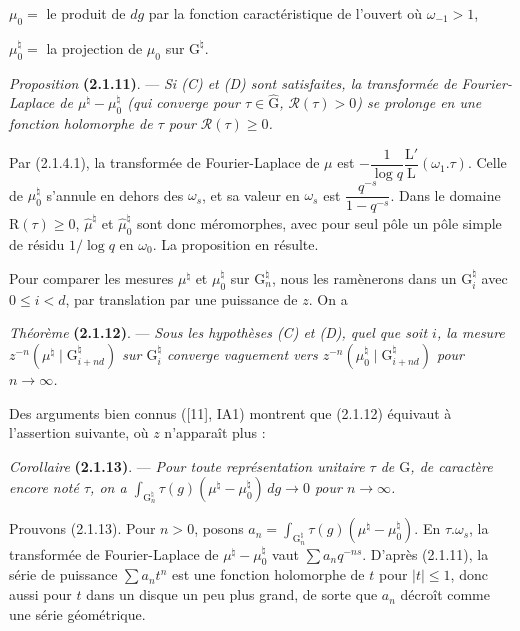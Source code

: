 \documentclass[11pt,leqno]{article}
\begin{document}
\noindent \(\mu_0=\) le produit de \(dg\) par la fonction caractéristique de l’ouvert où \(\omega_{-1}>1\),

\noindent \(\mu_0^{\natural}=\) la projection de \(\mu_0\) sur \(\mathrm{G}^{\natural}\).

\textit{Proposition} \textbf{(2.1.11)}. — \textit{Si \textup{(C)} et \textup{(D)} sont satisfaites, la transformée de Fourier-Laplace de \(\mu^{\natural}-\mu_0^{\natural}\) (qui converge pour \(\tau\in\widehat{\mathrm{G}}\), \(\mathscr{R}(\tau)>0\)) se prolonge en une fonction holomorphe de \(\tau\) pour \(\mathscr{R}(\tau)\geq0\).}

Par (2.1.4.1), la transformée de Fourier-Laplace de \(\mu\) est \(-\dfrac{1}{\log q}\dfrac{\mathrm{L}'}{\mathrm{L}}(\omega_1.\tau)\). Celle de \(\mu_0^{\natural}\) s’annule en dehors des \(\omega_s\), et sa valeur en \(\omega_s\) est \(\dfrac{q^{-s}}{1-q^{-s}}\). Dans le domaine \(\mathrm{R}(\tau)\geq0\), \(\widehat{\mu}^{\natural}\) et \(\widehat{\mu}_0^{\natural}\) sont donc méromorphes, avec pour seul pôle un pôle simple de résidu \(1/\log q\) en \(\omega_0\). La proposition en résulte.

Pour comparer les mesures \(\mu^{\natural}\) et \(\mu_0^{\natural}\) sur \(\mathrm{G}_n^{\natural}\), nous les ramènerons dans un \(\mathrm{G}_i^{\natural}\) avec \(0\leq i<d\), par translation par une puissance de \(z\). On a

\textit{Théorème} \textbf{(2.1.12)}. — \textit{Sous les hypothèses \textup{(C)} et \textup{(D)}, quel que soit \(i\), la mesure \(z^{-n}(\mu^{\natural}\mid\mathrm{G}_{i+nd}^{\natural})\) sur \(\mathrm{G}_i^{\natural}\) converge vaguement vers \(z^{-n}(\mu_0^{\natural}\mid\mathrm{G}_{i+nd}^{\natural})\) pour \(n\to\infty\).}

Des arguments bien connus ([11], IA1) montrent que (2.1.12) équivaut à l’assertion suivante, où \(z\) n’apparaît plus :

\textit{Corollaire} \textbf{(2.1.13)}. — \textit{Pour toute représentation unitaire \(\tau\) de \(\mathrm{G}\), de caractère encore noté \(\tau\), on a \(\displaystyle\int_{\mathrm{G}_n^{\natural}}\tau(g)(\mu^{\natural}-\mu_0^{\natural})\,dg\to0\) pour \(n\to\infty\).}

Prouvons (2.1.13). Pour \(n>0\), posons \(a_n=\displaystyle\int_{\mathrm{G}_n^{\natural}}\tau(g)(\mu^{\natural}-\mu_0^{\natural})\). En \(\tau.\omega_s\), la transformée de Fourier-Laplace de \(\mu^{\natural}-\mu_0^{\natural}\) vaut \(\sum a_nq^{-ns}\). D’après (2.1.11), la série de puissance \(\sum a_nt^n\) est une fonction holomorphe de \(t\) pour \(|t|\leq1\), donc aussi pour \(t\) dans un disque un peu plus grand, de sorte que \(a_n\) décroît comme une série géométrique.
\end{document}

